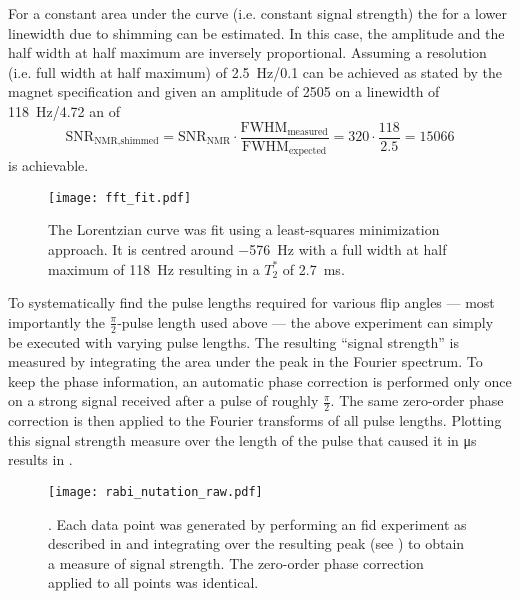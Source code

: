 For a constant area under the curve (i.e. constant signal strength) the \snrnmr{} for a lower linewidth due to shimming can be estimated. In this case, the amplitude and the half width at half maximum are inversely proportional. Assuming a resolution (i.e. full width at half maximum) of \qty{2.5}{\hertz}/\qty{0.1}{\partspermillion} can be achieved as stated by the magnet specification and given an amplitude of 2505 on a linewidth of \qty{118}{\hertz}/\qty{4.72}{\partspermillion} an \snrnmr{} of
\[
    \text{SNR}_{\text{NMR,shimmed}} = \text{SNR}_{\text{NMR}} \cdot \frac{\text{FWHM}_{\text{measured}}}{\text{FWHM}_{\text{expected}}} = 320 \cdot \frac{118}{2.5} = \num{15066}
\]
is achievable.

\begin{figure}[h!bt]
    \centering
    \texttt{[image: fft\_fit.pdf]}
    \caption{ The Lorentzian curve was fit using a least-squares minimization approach. It is centred around \qty{-576}{\hertz} with a full width at half maximum of \qty{118}{\hertz} resulting in a \(T_2^*\) of \qty{2.7}{\milli\second}.}
\end{figure}

To systematically find the pulse lengths required for various flip angles --- most importantly the \(\frac{\pi}{2}\)-pulse length used above --- the above experiment can simply be executed with varying pulse lengths. The resulting \enquote{signal strength} is measured by integrating the area under the peak in the Fourier spectrum. To keep the phase information, an automatic phase correction is performed only once on a strong signal received after a pulse of roughly \(\frac{\pi}{2}\). The same zero-order phase correction is then applied to the Fourier transforms of all pulse lengths. Plotting this signal strength measure over the length of the pulse that caused it in \unit{\micro\second} results in .

\begin{figure}[h!bt]
    \centering
    \texttt{[image: rabi\_nutation\_raw.pdf]}
    \caption{. Each data point was generated by performing an \acrshort{fid} experiment as described in  and integrating over the resulting peak (see ) to obtain a measure of signal strength. The zero-order phase correction applied to all points was identical.}
\end{figure}

